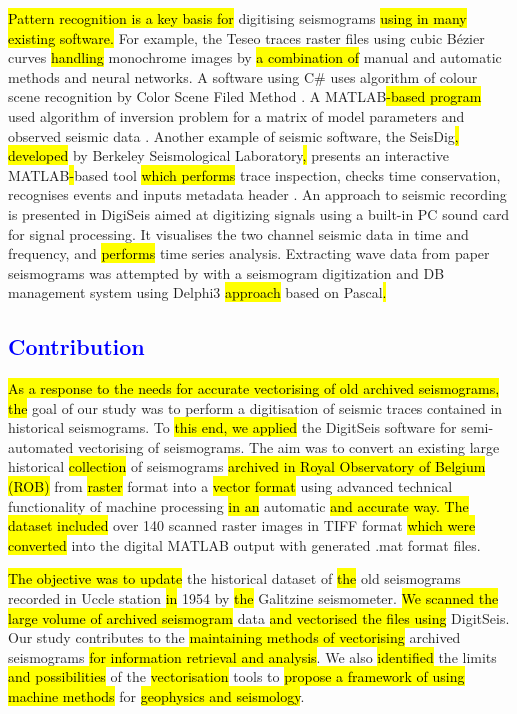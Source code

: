 \documentclass[sensors,article,submit,moreauthors,pdftex]{Definitions/mdpi}
\begin{document}
\hl{Pattern recognition is a key basis for }digitising seismograms\hl{ using in many existing software. }For example, the Teseo \cite{Pintoreetal2005} traces raster files using cubic Bézier curves\hl{ handling }monochrome images by \hl{a combination of }manual and automatic methods and neural networks. A software using C\# uses algorithm of colour scene recognition by Color Scene Filed Method \cite{Wangetal2016}. A\hl{ }MATLAB\hl{-based program }used algorithm of inversion problem for a matrix of model parameters and observed seismic data \cite{XuXu}. Another example of seismic software, the SeisDig\hl{, developed }by Berkeley Seismological Laboratory\hl{, }presents an interactive MATLAB\hl{-}based tool \hl{which performs }trace inspection, checks\hl{ }time conservation, recognises\hl{ }events and inputs\hl{ }metadata header \cite{BromirskiChuang2003}. An approach to seismic recording is presented in DigiSeis \cite{Khanetal2012} aimed at digitizing signals using a built-in PC sound card for signal processing. It visualises the two channel seismic data in time and frequency, and\hl{ performs }time series analysis. Extracting wave data from paper seismograms was attempted by \cite{Liuetal2001} with a seismogram digitization and DB management system using Delphi3 \hl{approach }based on Pascal\hl{.}

\subsection{\textcolor{blue}{Contribution}}
\hl{As a response to the needs for accurate vectorising of old archived seismograms, the} goal of our study was to perform a\hl{ }digitisation of seismic traces contained in historical seismograms. To \hl{this end, we applied} the DigitSeis software \cite{BogiatzisIshii2016} for\hl{ }semi-automated vectorising of seismograms. The aim was to convert an existing large historical \hl{collection }of seismograms\hl{ } \hl{archived in Royal Observatory of Belgium (ROB) } from \hl{raster }format into a \hl{vector format }using advanced technical functionality of machine processing \hl{in an }automatic\hl{ and accurate way. The dataset included} over 140 scanned raster images in TIFF format \hl{which were converted} into the digital MATLAB output with generated .mat format files.

\hl{The objective was to update }the historical dataset of \hl{the }old seismograms recorded in Uccle station \hl{in }1954 by \hl{the }Galitzine seismometer. \hl{We scanned the large volume of archived seismogram }data \hl{and vectorised the files using} DigitSeis. Our study contributes to the \hl{maintaining methods of vectorising }archived\hl{ }seismograms \hl{for information retrieval and analysis}. We also \hl{identified }the limits \hl{and possibilities }of the \hl{vectorisation }tools to \hl{propose a framework of using machine methods }for \hl{geophysics and seismology}. 
\end{document}
